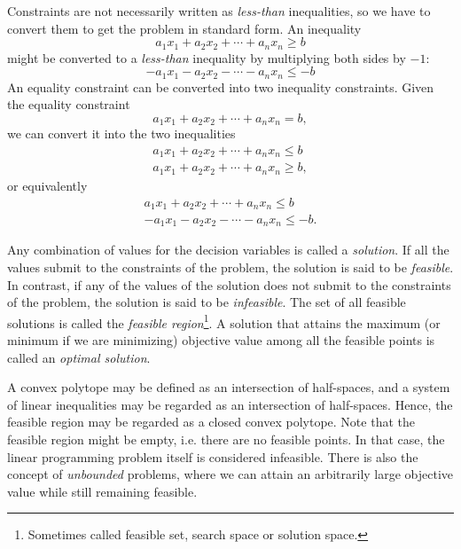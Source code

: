 Constraints are not necessarily written as
\textit{less-than} inequalities, so we have to convert them to get the problem
in standard form. An inequality
\[
a_1 x_1 + a_2 x_2 + \cdots + a_n x_n \geq b
\]
might be converted to a \textit{less-than} inequality by multiplying both
sides by $-1$:
\[
- a_1 x_1 - a_2 x_2 - \cdots - a_n x_n \leq -b
\]
An equality constraint can be converted into two inequality constraints.
Given the equality constraint
\[
a_1 x_1 + a_2 x_2 + \cdots + a_n x_n = b,
\]
we can convert it into the two inequalities
\[
\begin{array}{c}
a_1 x_1 + a_2 x_2 + \cdots + a_n x_n \leq b \\
a_1 x_1 + a_2 x_2 + \cdots + a_n x_n \geq b,
\end{array}
\]
or equivalently
\[
\begin{array}{c}
a_1 x_1 + a_2 x_2 + \cdots + a_n x_n \leq b \\
- a_1 x_1 - a_2 x_2 - \cdots - a_n x_n \leq -b.
\end{array}
\]

Any combination of values for the decision variables is called a \textit{solution}.
If all the values submit to the constraints of the problem, the solution is
said to be \textit{feasible}. In contrast, if any of the values of the solution
does not submit to the constraints of the problem, the solution is said to
be \textit{infeasible}. The set of all feasible solutions is called the
\textit{feasible region}\footnote{Sometimes called feasible set,
search space or solution space.}\cite{nocedal}. A solution that attains
the maximum (or minimum if we are minimizing) objective value among all
the feasible points is called an \textit{optimal solution}.

A convex polytope may be defined as an intersection of half-spaces, and a system
of linear inequalities may be regarded as an intersection of half-spaces\cite{branko}.
Hence, the feasible region may be regarded as a closed convex polytope.
Note that the feasible region might be empty, i.e. there are no feasible points.
In that case, the linear programming problem itself is considered infeasible.
There is also the concept of \textit{unbounded} problems, where we can attain
an arbitrarily large objective value while still remaining feasible.

